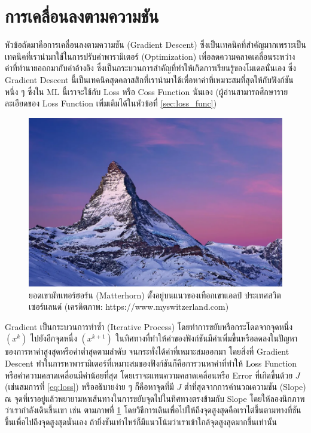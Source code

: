 \section{การเคลื่อนลงตามความชัน}
\label{sec:gradient_descent}

หัวข้อถัดมาคือการเคลื่อนลงตามความชัน (Gradient Descent) ซึ่งเป็นเทคนิคที่สำคัญมากเพราะเป็นเทคนิคที่เรานำมาใช้ในการปรับค่าพารามิเตอร์ (Optimization) เพื่อลดความคลาดเคลื่อนระหว่างค่าที่ทำนายออกมากับค่าอ้างอิง ซึ่งเป็นกระบวนการสำคัญที่ทำให้เกิดการเรียนรู้ของโมเดลนั่นเอง ซึ่ง Gradient Descent นี้เป็นเทคนิคสุดคลาสสิกที่เรานำมาใช้เพื่อหาค่าที่เหมาะสมที่สุดให้กับฟังก์ชันหนึ่ง ๆ ซึ่งใน ML นี้เราจะใช้กับ Loss หรือ Coss Function นั่นเอง (ผู้อ่านสามารถศึกษารายละเอียดของ Loss Function เพิ่มเติมได้ในหัวข้อที่ \ref{sec:loss_func})

\begin{figure}[H]
    \centering
    \includegraphics[width=0.6\linewidth]{fig/matterhorn.png}
    \caption{ยอดเขามัทเทอร์ฮอร์น (Matterhorn) ตั้งอยู่บนแนวของเทือกเขาแอลป์ ประเทศสวิตเซอร์แลนด์ (เครดิตภาพ: https://www.myswitzerland.com)}
    \label{fig:matterhorn}
\end{figure}

Gradient เป็นกระบวนการทำซ้ำ (Iterative Process) โดยทําการขยับหรือกระโดดจากจุดหนึ่ง $(x^{k})$ ไปยังอีกจุดหนึ่ง $(x^{k+1})$ ในทิศทางที่ทําให้ค่าของฟังก์ชันมีค่าเพิ่มขึ้นหรือลดลงในปัญหาของการหาค่าสูงสุดหรือค่าต่ำสุดตามลำดับ จนกระทั่งได้ค่าที่เหมาะสมออกมา โดยสิ่งที่ Gradient Descent ทำในการหาพารามิเตอร์ที่เหมาะสมของฟังก์ชันก็คือการวนหาค่าที่ทำให้ Loss Function หรือค่าความคลาดเคลื่อนมีค่าน้อยที่สุด โดยเราจะแทนความคลาดเคลื่อนหรือ Error ที่เกิดขึ้นด้วย $J$ (เช่นสมการที่ \eqref{eq:loss}) หรืออธิบายง่าย ๆ ก็คือหาจุดที่มี $J$ ต่ำที่สุดจากการคำนวณความชัน (Slope) ณ จุดที่เราอยู่แล้วพยายามหาเส้นทางในการขยับจุดไปในทิศทางตรงข้ามกับ Slope โดยให้ลองนึกภาพว่าเรากำลังเดินขึ้นเขา เช่น ตามภาพที่ \ref{fig:matterhorn} โดยวิธีการเดินเพื่อไปให้ถึงจุดสูงสุดคือเราไต่ขึ้นตามทางที่ชันขึ้นเพื่อไปถึงจุดสูงสุดนั่นเอง ถ้ายิ่งชันเท่าไหร่ก็มีแนวโน้มว่าเราเข้าใกล้จุดสูงสุดมากขึ้นเท่านั้น

